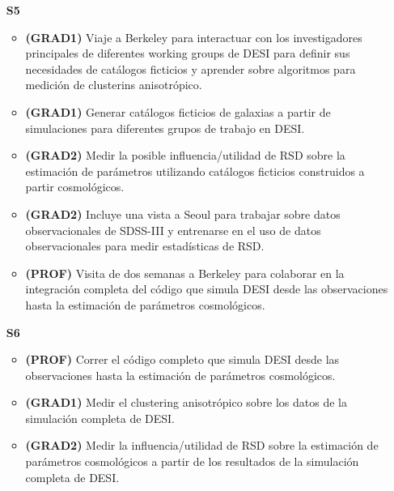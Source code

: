 \begin{itemize}
\item[\bf S5]
\begin{itemize}
\item {\bf (GRAD1)} Viaje a Berkeley para interactuar con los investigadores
  principales de diferentes working groups de DESI para definir sus necesidades
  de cat\'alogos ficticios y aprender sobre algoritmos para medici\'on
  de clusterins anisotr\'opico.
\item {\bf (GRAD1)} Generar cat\'alogos ficticios de galaxias a partir
  de simulaciones para diferentes grupos de trabajo en DESI. 
\item {\bf (GRAD2)} Medir la posible influencia/utilidad de RSD 
sobre la estimaci\'on de par\'ametros utilizando cat\'alogos ficticios
construidos a partir cosmol\'ogicos. 
\item {\bf (GRAD2)} Incluye una vista a Seoul para trabajar sobre
  datos observacionales de SDSS-III y entrenarse en el uso de datos
  observacionales para medir estad\'isticas de RSD.
\item {\bf (PROF)} Visita de dos semanas a Berkeley para colaborar en
  la integraci\'on completa del c\'odigo    que simula DESI desde las
  observaciones hasta la estimaci\'on de  par\'ametros cosmol\'ogicos.  
\end{itemize}

\item[\bf S6]
\begin{itemize}
\item {\bf (PROF)} Correr el c\'odigo completo que simula DESI desde
  las observaciones hasta la estimaci\'on de par\'ametros
  cosmol\'ogicos. 
\item {\bf (GRAD1)} Medir el clustering anisotr\'opico sobre los datos
  de la simulaci\'on completa de DESI.
\item {\bf (GRAD2)} Medir la influencia/utilidad de RSD sobre la
  estimaci\'on de par\'ametros cosmol\'ogicos a partir de los
  resultados de la simulaci\'on completa de DESI.

\end{itemize}

\end{itemize}
